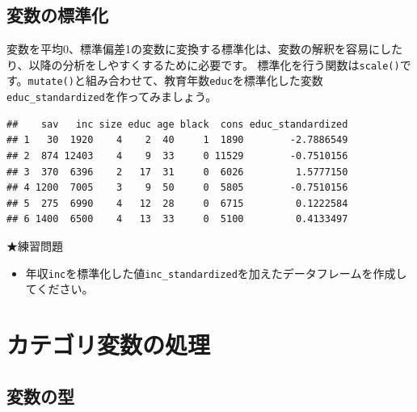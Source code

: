 \documentclass[]{book}
\newenvironment{Shaded}{\begin{snugshade}}{\end{snugshade}}
\newcommand{\KeywordTok}[1]{\textcolor[rgb]{0.13,0.29,0.53}{\textbf{#1}}}
\newcommand{\DataTypeTok}[1]{\textcolor[rgb]{0.13,0.29,0.53}{#1}}
\newcommand{\StringTok}[1]{\textcolor[rgb]{0.31,0.60,0.02}{#1}}
\newcommand{\OperatorTok}[1]{\textcolor[rgb]{0.81,0.36,0.00}{\textbf{#1}}}
\newcommand{\NormalTok}[1]{#1}
\providecommand{\tightlist}{%
  \setlength{\itemsep}{0pt}\setlength{\parskip}{0pt}}
\begin{document}
\subsection{変数の標準化}\label{ux5909ux6570ux306eux6a19ux6e96ux5316}

変数を平均0、標準偏差1の変数に変換する標準化は、変数の解釈を容易にしたり、以降の分析をしやすくするために必要です。
標準化を行う関数は\texttt{scale()}です。\texttt{mutate()}と組み合わせて、教育年数\texttt{educ}を標準化した変数\texttt{educ\_standardized}を作ってみましょう。

\begin{Shaded}
\end{Shaded}

\begin{verbatim}
##    sav   inc size educ age black  cons educ_standardized
## 1   30  1920    4    2  40     1  1890        -2.7886549
## 2  874 12403    4    9  33     0 11529        -0.7510156
## 3  370  6396    2   17  31     0  6026         1.5777150
## 4 1200  7005    3    9  50     0  5805        -0.7510156
## 5  275  6990    4   12  28     0  6715         0.1222584
## 6 1400  6500    4   13  33     0  5100         0.4133497
\end{verbatim}

★練習問題

\begin{itemize}
\tightlist
\item
  年収\texttt{inc}を標準化した値\texttt{inc\_standardized}を加えたデータフレームを作成してください。
\end{itemize}

\section{カテゴリ変数の処理}\label{ux30abux30c6ux30b4ux30eaux5909ux6570ux306eux51e6ux7406}

\subsection{変数の型}\label{ux5909ux6570ux306eux578b}
\end{document}
